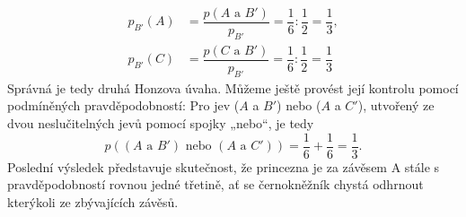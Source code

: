 \begin{mdframed}[style=mdexam]
\begin{example}
\begin{align*}
      p_{B'}(A) &= \dfrac{p(A\text{ a }B')}{p_{B'}} = \dfrac{1}{6}:\dfrac{1}{2} = \dfrac{1}{3},  \\
      p_{B'}(C) &= \dfrac{p(C\text{ a }B')}{p_{B'}} = \dfrac{1}{6}:\dfrac{1}{2} = \dfrac{1}{3}    
    \end{align*}
    Správná je tedy druhá Honzova úvaha. Můžeme ještě provést její kontrolu pomocí podmíněných
    pravděpodobností: Pro jev (\(A\) a \(B'\)) nebo (\(A\) a \(C'\)), utvořený ze dvou
    neslučitelných jevů pomocí spojky „nebo“, je tedy
    \begin{equation*}
      p\left((A\text{ a }B')\text{ nebo }(A\text{ a }C')\right) = \dfrac{1}{6} + \dfrac{1}{6} 
        = \dfrac{1}{3}.
    \end{equation*}
    Poslední výsledek představuje skutečnost, že princezna je za závěsem A stále s pravděpodobností
    rovnou jedné třetině, ať se černokněžník chystá odhrnout kterýkoli ze zbývajících závěsů.
  \end{example}
\end{mdframed}